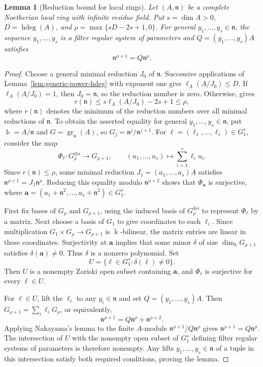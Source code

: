 \documentclass[11pt,reqno]{amsart}
\numberwithin{equation}{section}
\newtheorem{lemma}[theorem]{Lemma}
\theoremstyle{definition}
\newcommand{\hdeg}{\operatorname{hdeg}}
\begin{document}
\begin{lemma}[Reduction bound for local rings]
\label{lem:ring-reduction-bound}
Let $(A,\mathfrak n)$ be a complete Noetherian local ring with
infinite residue field. Put $s=\dim A>0$, $D=\hdeg(A)$, and
$\rho=\max\{sD-2s+1,0\}$.
For general $y_1,\ldots,y_s\in\mathfrak n$, the sequence
$y_1,\ldots,y_s$ is a filter regular system of parameters and
$Q=(y_1,\ldots,y_s)A$ satisfies
\[
 \mathfrak n^{\rho+1}=Q\mathfrak n^\rho.
\]
\end{lemma}
\begin{proof}
Choose a general minimal reduction $J_0$ of $\mathfrak n$.
Successive applications of Lemma~\ref{lem:generic-power-hdeg}
with exponent one give $\ell_A(A/J_0)\le D$.
If $\ell_A(A/J_0)=1$, then $J_0=\mathfrak n$, so the reduction
number is zero. Otherwise, \cite[Theorem~2.5]{Vasconcelos2003} gives
\[
 r(\mathfrak n)\le s\ell_A(A/J_0)-2s+1\le\rho,
\]
where $r(\mathfrak n)$ denotes the minimum of the reduction numbers
over all minimal reductions of $\mathfrak n$.
To obtain the asserted equality for general $y_1,\ldots,y_s\in\mathfrak n$, put
$\Bbbk=A/\mathfrak n$ and $G=\operatorname{gr}_{\mathfrak n}(A)$,
so $G_j=\mathfrak n^j/\mathfrak n^{j+1}$. For
$\boldsymbol\ell=(\ell_1,\ldots,\ell_s)\in G_1^s$, consider the map
\[
 \Phi_{\boldsymbol\ell}:G_\rho^{\oplus s}\longrightarrow G_{\rho+1},\qquad
 (u_1,\ldots,u_s)\longmapsto\sum_{i=1}^s\ell_i u_i.
\]
Since $r(\mathfrak n)\le\rho$, some minimal reduction
$J_1=(a_1,\ldots,a_s)A$ satisfies
$\mathfrak n^{\rho+1}=J_1\mathfrak n^\rho$.
Reducing this equality modulo $\mathfrak n^{\rho+2}$ shows that
$\Phi_{\boldsymbol a}$ is surjective, where
$\boldsymbol a=(a_1+\mathfrak n^2,\ldots,a_s+\mathfrak n^2)\in G_1^s$.

First fix bases of $G_\rho$ and $G_{\rho+1}$, using the induced
basis of $G_\rho^{\oplus s}$ to represent $\Phi_{\boldsymbol\ell}$
by a matrix. Next choose a basis of $G_1$ to give coordinates to
each $\ell_i$. Since multiplication $G_1\times G_\rho\to G_{\rho+1}$
is $\Bbbk$-bilinear, the matrix entries are linear in these
coordinates. Surjectivity at $\boldsymbol a$ implies that some
minor $\delta$ of size $\dim_{\Bbbk}G_{\rho+1}$ satisfies
$\delta(\boldsymbol a)\ne0$. Thus $\delta$ is a nonzero polynomial.
Set
\[
 U=\{\boldsymbol\ell\in G_1^s:\delta(\boldsymbol\ell)\ne0\}.
\]
Then $U$ is a nonempty Zariski open subset containing
$\boldsymbol a$, and $\Phi_{\boldsymbol\ell}$ is surjective
for every $\boldsymbol\ell\in U$.

For $\boldsymbol\ell\in U$, lift the $\ell_i$ to any $y_i\in\mathfrak n$
and set $Q=(y_1,\ldots,y_s)A$.
Then $G_{\rho+1}=\sum_i\ell_iG_\rho$, or equivalently,
\[
 \mathfrak n^{\rho+1}=Q\mathfrak n^\rho+\mathfrak n^{\rho+2}.
\]
Applying Nakayama's lemma to the finite $A$-module
$\mathfrak n^{\rho+1}/Q\mathfrak n^\rho$ gives
$\mathfrak n^{\rho+1}=Q\mathfrak n^\rho$.
The intersection of $U$ with the nonempty open subset of $G_1^s$
defining filter regular systems of parameters is therefore nonempty.
Any lifts $y_1,\ldots,y_s\in\mathfrak n$ of a tuple in this
intersection satisfy both required conditions, proving the lemma.
\end{proof}
\end{document}
